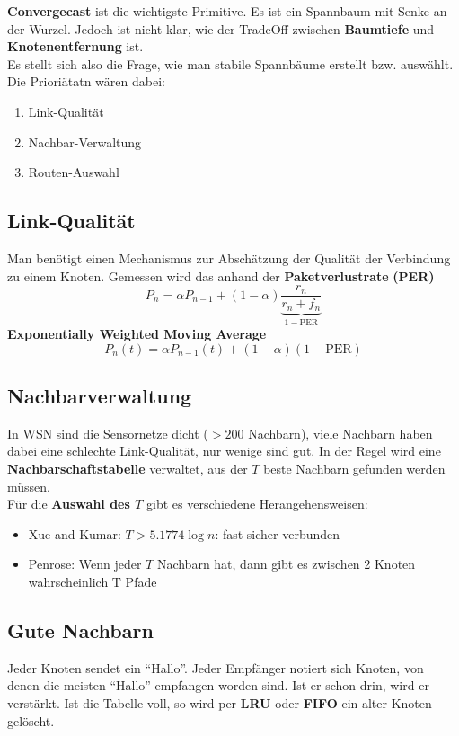 \documentclass[a4paper]{article}
\begin{document}
\textbf{Convergecast} ist die wichtigste Primitive. Es ist ein Spannbaum mit Senke an der Wurzel. Jedoch ist nicht klar, wie der TradeOff zwischen \textbf{Baumtiefe} und \textbf{Knotenentfernung} ist. \\

Es stellt sich also die Frage, wie man stabile Spannbäume erstellt bzw. auswählt. Die Prioriätatn wären dabei: 
\begin{enumerate}
	\item Link-Qualität
	\item Nachbar-Verwaltung
	\item Routen-Auswahl
\end{enumerate}

\subsection{Link-Qualität}
Man benötigt einen Mechanismus zur Abschätzung der Qualität der Verbindung zu einem Knoten.
Gemessen wird das anhand der \textbf{Paketverlustrate} \textbf{(PER)}
$$P_n = \alpha P_{n-1} + (1-\alpha) \underbrace{\dfrac{r_n}{r_n + f_n}}_{1-\text{PER}}$$
\textbf{Exponentially Weighted Moving Average}
$$P_n(t) = \alpha P_{n-1}(t) + (1-\alpha) (1-\text{PER})$$
\subsection{Nachbarverwaltung}
In WSN sind die Sensornetze dicht ($>200$ Nachbarn), viele Nachbarn haben dabei eine schlechte Link-Qualität, nur wenige sind gut. In der Regel wird eine \textbf{Nachbarschaftstabelle} verwaltet, aus der $T$ beste Nachbarn gefunden werden müssen.\\

Für die \textbf{Auswahl des $T$} gibt es verschiedene Herangehensweisen:
\begin{itemize}
	\item Xue and Kumar: $T>5.1774 \log n$: fast sicher verbunden
	\item Penrose: Wenn jeder $T$ Nachbarn hat, dann gibt es zwischen 2 Knoten wahrscheinlich T Pfade 
\end{itemize}
\subsection{Gute Nachbarn}
Jeder Knoten sendet ein ``Hallo''. Jeder Empfänger notiert sich Knoten, von denen die meisten ``Hallo'' empfangen worden sind. Ist er schon drin, wird er verstärkt. Ist die Tabelle voll, so wird per \textbf{LRU} oder \textbf{FIFO} ein alter Knoten gelöscht.\\
\end{document}
